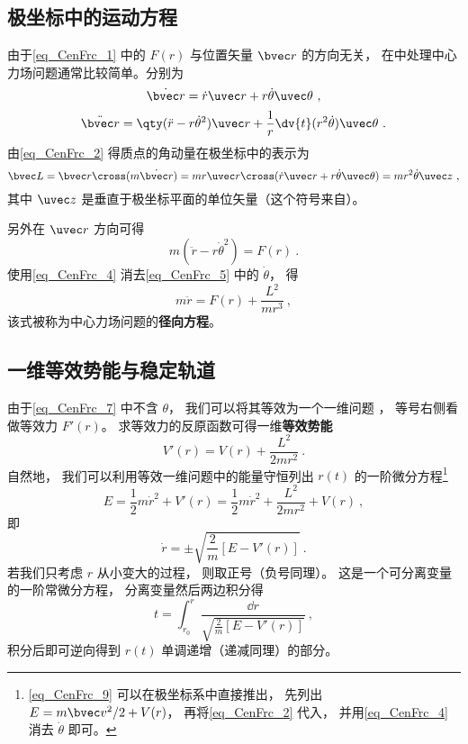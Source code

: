 \subsection{极坐标中的运动方程}
由于\autoref{eq_CenFrc_1} 中的 $F(r)$ 与位置矢量 $\bvec r$ 的方向无关， 在中处理中心力场问题通常比较简单。分别为
\begin{equation}\label{eq_CenFrc_2}
\dot{\bvec r} = \dot r \uvec r + r\dot\theta\uvec\theta~,
\end{equation}
\begin{equation}\label{eq_CenFrc_3}
\ddot{\bvec r} = \qty(\ddot{r} - r \dot\theta^2)\uvec r + \frac 1r \dv{t} (r^2\dot\theta)\uvec \theta~.
\end{equation}
由\autoref{eq_CenFrc_2} 得质点的角动量在极坐标中的表示为
\begin{equation}\label{eq_CenFrc_4}
\bvec L = \bvec r \cross (m \dot{\bvec r})
= mr \uvec r \cross (\dot r \uvec r + r\dot\theta \uvec\theta)
= mr^2\dot \theta \uvec z~,
\end{equation}
其中 $\uvec z$ 是垂直于极坐标平面的单位矢量（这个符号来自）。 

另外在 $\uvec r$ 方向可得
\begin{equation}\label{eq_CenFrc_5}
m(\ddot{r} - r \dot\theta^2) = F(r)~.
\end{equation}
使用\autoref{eq_CenFrc_4} 消去\autoref{eq_CenFrc_5} 中的 $\dot\theta$， 得
\begin{equation}\label{eq_CenFrc_7}
m\ddot r = F(r) + \frac{L^2}{mr^3}~,
\end{equation}
该式被称为中心力场问题的\textbf{径向方程}。

\subsection{一维等效势能与稳定轨道}
由于\autoref{eq_CenFrc_7} 中不含 $\theta$， 我们可以将其等效为一个一维问题 %
， 等号右侧看做等效力 $F'(r)$。 求等效力的反原函数可得一维\textbf{等效势能}
\begin{equation}\label{eq_CenFrc_6}
V'(r) = V(r) + \frac{L^2}{2mr^2}~.
\end{equation}
自然地， 我们可以利用等效一维问题中的能量守恒列出 $r(t)$ 的一阶微分方程\footnote{\autoref{eq_CenFrc_9} 可以在极坐标系中直接推出， 先列出 $E = m\bvec v^2/2 + V(r)$， 再将\autoref{eq_CenFrc_2} 代入， 并用\autoref{eq_CenFrc_4} 消去 $\dot\theta$ 即可。}
\begin{equation}\label{eq_CenFrc_9}
E = \frac 12 m\dot r^2 + V'(r) = \frac 12 m\dot r^2 + \frac{L^2}{2mr^2} + V(r)~,
\end{equation}
即
\begin{equation}\label{eq_CenFrc_10}
\dot r = \pm\sqrt{\frac 2m [E - V'(r)]}~.
\end{equation}
若我们只考虑 $r$ 从小变大的过程， 则取正号（负号同理）。 这是一个可分离变量的一阶常微分方程， %
分离变量然后两边积分得
\begin{equation}\label{eq_CenFrc_8}
t = \int_{r_0}^{r} \frac{\dd{r}}{\sqrt{\frac 2m [E - V'(r)]}}~,
\end{equation}
积分后即可逆向得到 $r(t)$ 单调递增（递减同理）的部分。

